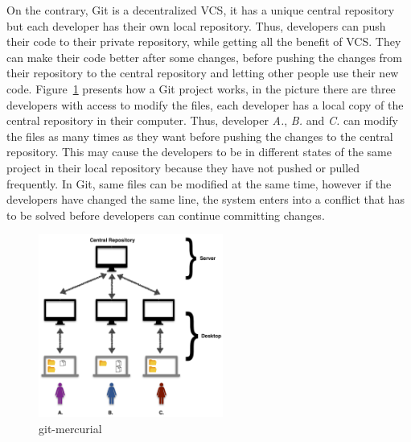 \documentclass[a4paper, 12pt]{book}
\begin{document}
On the contrary, Git is a decentralized VCS, it has a unique central repository but each developer has their own local repository. Thus, developers can push their code to their private repository, while getting all the benefit of VCS. They can make their code better after some changes, before pushing the changes from their repository to the central repository and letting other people use their new code. Figure~\ref{fig:git-mercurial} presents how a Git project works, in the picture there are three developers with access to modify the files, each developer has a local copy of the central repository in their computer. Thus, developer \emph{A.}, \emph{B.} and \emph{C.} can modify the files as many times as they want before pushing the changes to the central repository. This may cause the developers to be in different states of the same project in their local repository because they have not pushed or pulled frequently. In Git, same files can be modified at the same time, however if the developers have changed the same line, the system enters into a conflict that has to be solved before developers can continue committing changes.

\begin{figure}[ht]
\centering
\includegraphics[height= 6cm]{img/git-mercurial.png}
\caption{git-mercurial}
\label{fig:git-mercurial}       %
\end{figure}
\end{document}
